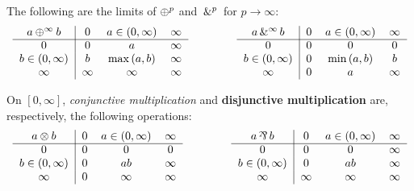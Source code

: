 \begin{lemma}
    The following are the limits of $\oplus^{p}$ and $\,\&^{p}\,$ for $p \longrightarrow \infty$:
    \begin{equation*}
		\begin{tabular}{c|ccc}
			$a \psum{\infty} b$ & $0$ & $a \in (0,\infty)$ & $\infty$\\
			\cline{1-4}
			$0$ 			   & $0$ & $a$ 		& $\infty$\\
			$b \in (0,\infty)$ & $b$ & $\max{}(a,b)$		& $\infty$\\
			$\infty$ 		   & $\infty$ & $\infty$ & $\infty$
		\end{tabular}
		\hspace*{10ex}
		\begin{tabular}{c|ccc}
			\textnormal{$a \phsum{\infty} b$} & $0$ & $a \in (0,\infty)$ & $\infty$\\
			\cline{1-4}
			$0$ 		 	   & $0$ 		& $0$ 	   & $0$\\
			$b \in (0,\infty)$ & $0$ 		& $\min{}(a,b)$	   & $b$\\
			$\infty$ 		   & $0$ 	& $a$ & $\infty$
		\end{tabular}
	\end{equation*}
\end{lemma}

\begin{definition}[Multiplication]
\label{Multiplication}
    On $[0,\infty]$, \emph{conjunctive multiplication} and \textbf{disjunctive multiplication} are, respectively, the following operations:
    \begin{equation*}
		\begin{tabular}{c|ccc}
			$a \conmul{} b$ & $0$ & $a \in (0,\infty)$ & $\infty$\\
			\cline{1-4}
			$0$ 			   & $0$ & $0$ 		& $0$\\
			$b \in (0,\infty)$ & $0$ & $ab$		& $\infty$\\
			$\infty$ 		   & $0$ & $\infty$ & $\infty$
		\end{tabular}
		\hspace*{10ex}
		\begin{tabular}{c|ccc}
			\textnormal{$a \dismul{} b$} & $0$ & $a \in (0,\infty)$ & $\infty$\\
			\cline{1-4}
			$0$ 		 	   & $0$ 		& $0$ 	   & $\infty$\\
			$b \in (0,\infty)$ & $0$ 		& $ab$	   & $\infty$\\
			$\infty$ 		   & $\infty$ 	& $\infty$ & $\infty$
		\end{tabular}
	\end{equation*}
\end{definition}

